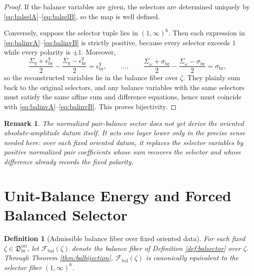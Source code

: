 \documentclass[11pt]{article}
\newcommand{\OriginSector}{\mathfrak D_{\mathrm{br}}^{\mathrm{ori}}}
\newcommand{\PolRead}{\epsilon_{\mathrm{br}}^{q}}
\newcommand{\PolScale}{\sigma_{\mathrm{br}}}
\newcommand{\SelRead}{\Sigma_{q}}
\newcommand{\SelScale}{\Sigma_{\omega}}
\newcommand{\BalFiberClass}{\mathscr F_{\mathrm{bal}}}
\newtheorem{definition}{Definition}
\newtheorem{remark}{Remark}
\begin{document}
\begin{proof}
If the balance variables are given, the selectors are determined uniquely by \eqref{eq:balselA}--\eqref{eq:balselB}, so the map is well defined.

Conversely, suppose the selector tuple lies in \((1,\infty)^{6}\). Then each expression in \eqref{eq:balinvA}--\eqref{eq:balinvB} is strictly positive, because every selector exceeds \(1\) while every polarity is \(\pm1\). Moreover,
\[
\frac{\SelRead+\PolRead}{2}-\frac{\SelRead-\PolRead}{2}=\PolRead,
\qquad
\ldots,
\qquad
\frac{\SelScale+\PolScale}{2}-\frac{\SelScale-\PolScale}{2}=\PolScale,
\]
so the reconstructed variables lie in the balance fiber over \(\zeta\). They plainly sum back to the original selectors, and any balance variables with the same selectors must satisfy the same affine sum and difference equations, hence must coincide with \eqref{eq:balinvA}--\eqref{eq:balinvB}. This proves bijectivity.
\end{proof}

\begin{remark}
The normalized pair-balance sector does not yet derive the oriented absolute-amplitude datum itself. It acts one layer lower only in the precise sense needed here: over each fixed oriented datum, it replaces the selector variables by positive normalized pair coefficients whose sum recovers the selector and whose difference already records the fixed polarity.
\end{remark}

\section{Unit-Balance Energy and Forced Balanced Selector}

\begin{definition}[Admissible balance fiber over fixed oriented data]
\label{def:balfiber}
For each fixed \(\zeta\in\OriginSector\), let \(\BalFiberClass(\zeta)\) denote the balance fiber of Definition \ref{def:balsector} over \(\zeta\). Through Theorem \ref{thm:balbijection}, \(\BalFiberClass(\zeta)\) is canonically equivalent to the selector fiber \((1,\infty)^{6}\).
\end{definition}
\end{document}
